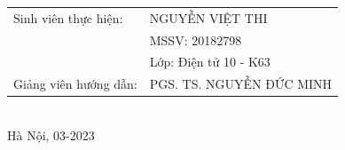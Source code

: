 \begin{titlepage}
\begin{center}
    \begin{tabular}{ l l }
        \fontsize{14pt}{0pt}\selectfont Sinh viên thực hiện: & \fontsize{14pt}{0pt}\selectfont NGUYỄN VIỆT THI  \vspace{0.2cm} \\ 
        & \fontsize{14pt}{0pt}\selectfont MSSV: 20182798 \vspace{0.2cm}\\
        & \fontsize{14pt}{0pt}\selectfont Lớp: Điện tử 10 - K63 \vspace{0.2cm}\\
        \fontsize{14pt}{0pt}\selectfont Giảng viên hướng dẫn: &  \fontsize{14pt}{0pt}\selectfont  PGS. TS. NGUYỄN ĐỨC MINH\vspace{0.2cm}\\
    \end{tabular} \\[3cm]
    \fontsize{14pt}{0pt}\selectfont Hà Nội, 03-2023
\end{center}
\end{titlepage} \cleardoublepage